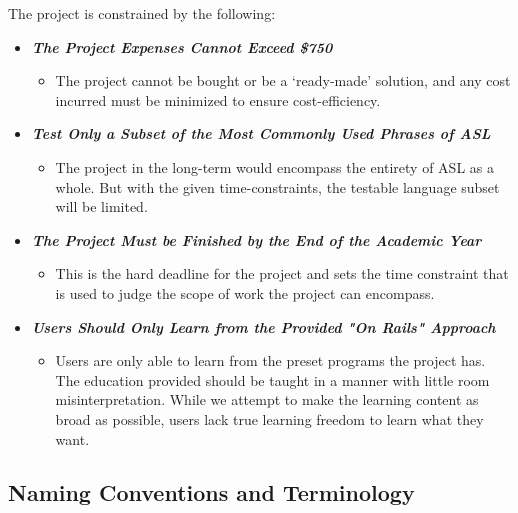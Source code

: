 \documentclass[12pt, titlepage]{article}
\begin{document}
The project is constrained by the following:

\begin{itemize}
    \item[] \textbf{\textit{The Project Expenses Cannot Exceed \$750}}
    \begin{itemize}
        \item The project cannot be bought or be a `ready-made' solution, and any cost incurred must be minimized to ensure cost-efficiency.
    \end{itemize}
    \item[] \textbf{\textit{Test Only a Subset of the Most Commonly Used Phrases of ASL}}
    \begin{itemize}
        \item The project in the long-term would encompass the entirety of ASL as a whole. But with the given time-constraints, the testable language subset will be limited.
    \end{itemize}
    \item[] \textbf{\textit{The Project Must be Finished by the End of the Academic Year}}
    \begin{itemize}
        \item This is the hard deadline for the project and sets the time constraint that is used to judge the scope of work the project can encompass.
    \end{itemize}
    \item[] \textbf{\textit{Users Should Only Learn from the Provided "On Rails" Approach}}
    \begin{itemize}
        \item Users are only able to learn from the preset programs the project has. The education provided should be taught in a manner with little room misinterpretation. While we attempt to make the learning content as broad as possible, users lack true learning freedom to learn what they want.
    \end{itemize}
\end{itemize}

\subsection{Naming Conventions and Terminology}
\end{document}
